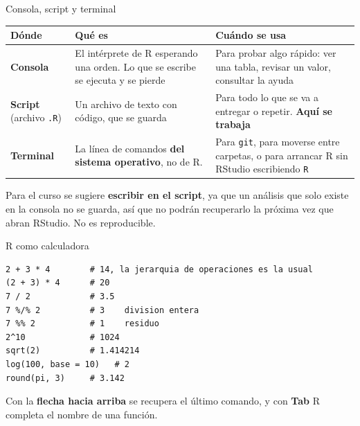 \documentclass[aspectratio=169,10pt]{beamer}
\newcommand{\destaca}[1]{%
  \par\vspace{3pt}\noindent
  \colorbox{azulClaro}{%
    \parbox{\dimexpr\linewidth-2\fboxsep\relax}{\vspace{3pt}#1\vspace{3pt}}}%
  \par\vspace{3pt}}
\begin{document}
\begin{frame}{Consola, script y terminal}
  \centering
  {\small
  \begin{tabular}{@{}p{2.6cm}p{4.9cm}p{4.9cm}@{}}
    \toprule
    \textbf{Dónde} & \textbf{Qué es} & \textbf{Cuándo se usa} \\
    \midrule
    \textbf{Consola} & El intérprete de R esperando una orden. Lo que se escribe
      se ejecuta y se pierde &
      Para probar algo rápido: ver una tabla, revisar un valor, consultar la ayuda \\
    \textbf{Script}  {\scriptsize(archivo \texttt{.R})} &
      Un archivo de texto con código, que se guarda &
      Para todo lo que se va a entregar o repetir. \textbf{Aquí se trabaja} \\
    \textbf{Terminal} & La línea de comandos \textbf{del sistema operativo}, no de R. &
      Para \texttt{git}, para moverse entre carpetas, o para arrancar R sin RStudio
      escribiendo \texttt{R} \\
    \bottomrule
  \end{tabular}}
  
  \vspace{0.5cm}
  \raggedright
  \destaca{Para el curso se sugiere \textbf{escribir en el script}, ya que un análisis que solo existe en la consola no se guarda, así que no podrán recuperarlo la próxima vez que abran RStudio. No es reproducible.}
\end{frame}

\begin{frame}[fragile]{R como calculadora}
\begin{lstlisting}
2 + 3 * 4        # 14, la jerarquia de operaciones es la usual
(2 + 3) * 4      # 20
7 / 2            # 3.5
7 %/% 2          # 3    division entera
7 %% 2           # 1    residuo
2^10             # 1024
sqrt(2)          # 1.414214
log(100, base = 10)   # 2
round(pi, 3)     # 3.142
\end{lstlisting}

  \vspace{0.25cm}
  \destaca{\small  Con la \textbf{flecha hacia arriba} se recupera el último comando, y con
  \textbf{Tab} R completa el nombre de una función.}
\end{frame}
\end{document}
